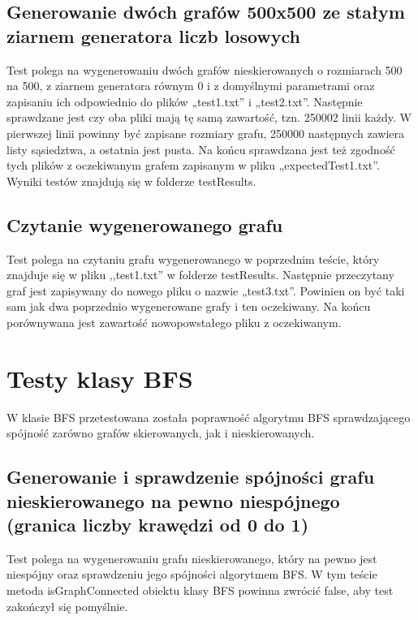 \documentclass[11pt,a4paper]{report}
\def\console #1{\begingroup\fontfamily{qcr}\selectfont#1\endgroup}
\begin{document}
	\subsection{Generowanie dwóch grafów 500x500 ze stałym ziarnem generatora liczb losowych}
	
	Test polega na wygenerowaniu dwóch grafów nieskierowanych o rozmiarach 500 na 500, 
	z ziarnem generatora równym 0 i z domyślnymi parametrami oraz zapisaniu ich odpowiednio do plików „test1.txt” i „test2.txt”. 
	Następnie sprawdzane jest czy oba pliki mają tę samą zawartość, tzn. 250002 linii każdy. 
	W pierwszej linii powinny być zapisane rozmiary grafu, 250000 następnych zawiera listy sąsiedztwa, 
	a ostatnia jest pusta. Na końcu sprawdzana jest też zgodność tych plików z oczekiwanym grafem zapisanym w pliku „expectedTest1.txt”.
	Wyniki testów znajdują się w folderze \console{testResults}.
	
	\vspace{2em}
	
	\subsection{Czytanie wygenerowanego grafu}
	
	Test polega na czytaniu grafu wygenerowanego w poprzednim teście, który znajduje się w pliku ,,test1.txt” w folderze \console{testResults}.
	Następnie przeczytany graf jest zapisywany do nowego pliku o nazwie „test3.txt”. 
	Powinien on być taki sam jak dwa poprzednio wygenerowane grafy i ten oczekiwany. 
	Na końcu porównywana jest zawartość nowopowstałego pliku z oczekiwanym.
	
	\newpage
	\section{Testy klasy BFS}
	
	W klasie \console{BFS} przetestowana została poprawność algorytmu BFS sprawdzającego spójność zarówno grafów skierowanych, jak i nieskierowanych.
	
	\vspace{2em}
	
	\subsection{Generowanie i sprawdzenie spójności grafu nieskierowanego na pewno niespójnego (granica liczby krawędzi od 0 do 1)}
	
	Test polega na wygenerowaniu grafu nieskierowanego, który na pewno jest niespójny oraz sprawdzeniu jego spójności algorytmem BFS.
	W tym teście metoda \console{isGraphConnected} obiektu klasy \console{BFS} powinna zwrócić \console{false}, aby test zakończył się pomyślnie.
	
\end{document}
